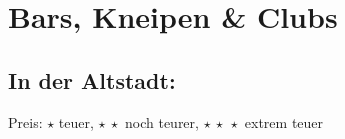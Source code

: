 
\newcommand{\place}[4]{\item[(\stepcounter{zahl}\thezahl) #1](#2)\\ #3\\\emph{Preis:} #4}

\section{Bars, Kneipen \& Clubs}
\subsection*{In der Altstadt:}
Preis: $\star$ teuer, $\star\ \star$ noch teurer, $\star\ \star\ \star$ extrem teuer


